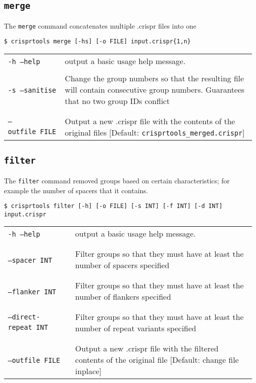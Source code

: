 \documentclass[11pt]{article} %
\newcommand{\optionflag}[1]{\texttt{-#1}}
\newcommand{\optionflagarg}[2]{\optionflag{#1}\ \texttt{#2}}
\newcommand{\longoptionflag}[1]{\texttt{--#1}}
\newcommand{\longoptionflagarg}[2]{\longoptionflag{#1}\ \texttt{#2}}
\newcommand{\combinedoptionflag}[2]{\optionflag{#1}\ \longoptionflag{#2}}
\newcommand{
	\combinedoptionflagarg}[3]{
		\shortstack[l]{
			\optionflagarg{#1}{#3} \\ \longoptionflagarg{#2}{#3}
		}
	}
\begin{document}
\subsection{\lstinline$merge$}
\label{sec:ctmerge}
The \texttt{merge} command concatenates multiple .crispr files into one
\begin{lstlisting}
$ crisprtools merge [-hs] [-o FILE] input.crispr{1,n}
\end{lstlisting}
 \begin{longtable}{  l    p{10cm} }

 \combinedoptionflag{h}{help} & output a basic usage help message. \\ \\
\combinedoptionflag{s}{sanitise} & Change the group numbers so that the resulting file will contain consecutive group numbers.  Guarantees that no two group IDs conflict \\ \\
\combinedoptionflagarg{o}{outfile}{FILE} & Output a new .crispr file with the contents of the original files [Default: \texttt{crisprtools\_merged.crispr}] \\ 

\end{longtable}

\subsection{\lstinline$filter$}
\label{sec:ctfilter}
The \texttt{filter} command removed groups based on certain characteristics; for example the number of spacers that it contains.
\begin{lstlisting}
$ crisprtools filter [-h] [-o FILE] [-s INT] [-f INT] [-d INT] input.crispr
\end{lstlisting}
 \begin{longtable}{  l    p{10cm} }

 \combinedoptionflag{h}{help} & output a basic usage help message. \\ \\
\combinedoptionflagarg{s}{spacer}{INT} & Filter groups so that they must have at least the number of spacers specified \\ \\
\combinedoptionflagarg{f}{flanker}{INT} & Filter groups so that they must have at least the number of flankers specified \\ \\
\combinedoptionflagarg{d}{direct-repeat}{INT} & Filter groups so that they must have at least the number of repeat variants specified \\ \\
\combinedoptionflagarg{o}{outfile}{FILE} & Output a new .crispr file with the filtered contents of the original file [Default: change file inplace] \\ 

\end{longtable}
\end{document}
